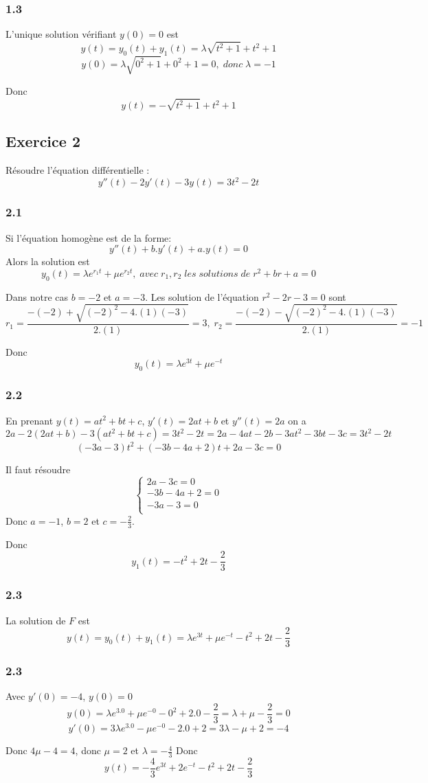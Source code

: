 \documentclass[]{book}
\theoremstyle{definition}
\begin{document}
\subsubsection*{1.3}
L'unique solution v\'erifiant $y(0)= 0$ est
$$y(t) = y_0(t) + y_1(t) = \lambda\sqrt{t^2+1} + t^2+1$$
$$y(0) = \lambda\sqrt{0^2+1} + 0^2+1 = 0,\; donc\; \lambda = -1$$

Donc
$$y(t) = -\sqrt{t^2+1} + t^2+1$$

\subsection*{Exercice 2}
R\'esoudre l'\'equation diff\'erentielle :
$$y''(t) - 2y'(t) -3y(t)= 3t^2 - 2t$$

\subsubsection*{2.1}
Si l'\'equation homog\`ene est de la forme:
$$y''(t) +b.y'(t) + a.y(t) = 0$$
Alors la solution est
$$y_0(t) = \lambda e^{r_1 t} + \mu e^{r_2 t},\; avec\; r_1, r_2\; les\; solutions\; de\; r^2 + br + a = 0$$

Dans notre cas $b = -2$ et $a = -3$. Les solution de l'\'equation $r^2 - 2r - 3 = 0$ sont
$$r_1 = \frac{-(-2)+\sqrt{(-2)^2-4.(1)(-3)}}{2.(1)} = 3,\; r_2 = \frac{-(-2)-\sqrt{(-2)^2-4.(1)(-3)}}{2.(1)} = -1$$

Donc
$$y_0(t) = \lambda e^{3t} + \mu e^{-t}$$

\subsubsection*{2.2}
En prenant $y(t) = at^2 + bt + c$, $y'(t) = 2at+b$ et $y''(t) = 2a$ on a
$$2a - 2(2at+b) -3(at^2+bt+c) = 3t^2 - 2t = 2a -4at -2b -3at^2 -3bt -3c = 3t^2 - 2t$$
$$(-3a - 3)t^2 + (-3b -4a +2)t + 2a - 3c = 0$$

Il faut r\'esoudre
$$
\left\{ 
\begin{array}{l}
 2a - 3c = 0\\
 -3b -4a + 2 = 0\\
 -3a - 3 = 0\\
\end{array}
\right. 
$$
Donc $a=-1$, $b=2$ et $c=-\frac{2}{3}$.

Donc 
$$y_1(t) = -t^2 + 2t -\frac{2}{3}$$

\subsubsection*{2.3}
La solution de $F$ est
$$y(t) = y_0(t) + y_1(t) = \lambda e^{3t} + \mu e^{-t} -t^2 + 2t -\frac{2}{3}$$

\subsubsection*{2.3}
Avec $y'(0) = -4$, $y(0) = 0$
$$y(0) = \lambda e^{3.0} + \mu e^{-0} -0^2 + 2.0 -\frac{2}{3} = \lambda + \mu - \frac{2}{3} = 0$$
$$y'(0) = 3\lambda e^{3.0} - \mu e^{-0} -2.0 + 2 = 3\lambda - \mu + 2 = -4$$

Donc $4\mu - 4 = 4$, donc $\mu = 2$ et $\lambda = -\frac{4}{3}$
Donc
$$y(t) = -\frac{4}{3}e^{3t} + 2 e^{-t} -t^2 + 2t -\frac{2}{3}$$

 
\end{document}
